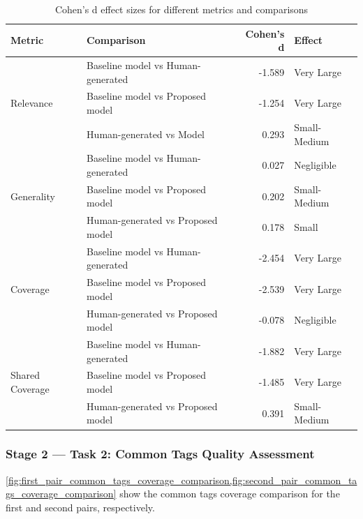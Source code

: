 \begin{table}[h]
    \centering
    \begin{tabular}{llrl}
        \hline
        \textbf{Metric} & \textbf{Comparison} & \textbf{Cohen's d} & \textbf{Effect} \\
        \hline
        \multirow{3}{*}{Relevance}
                        & Baseline model vs Human-generated   & -1.589             & Very Large      \\
                        & Baseline model  vs Proposed model   & -1.254             & Very Large      \\
                        & Human-generated vs Model      & 0.293              & Small-Medium    \\
        \hline
        \multirow{3}{*}{Generality}
                        & Baseline model vs Human-generated   & 0.027              & Negligible      \\
                        & Baseline model vs Proposed model   & 0.202              & Small-Medium    \\
                        & Human-generated vs Proposed model      & 0.178              & Small           \\
        \hline
        \multirow{3}{*}{Coverage}
                        & Baseline model vs Human-generated   & -2.454             & Very Large      \\
                        & Baseline model vs Proposed model   & -2.539             & Very Large      \\
                        & Human-generated vs Proposed model      & -0.078             & Negligible      \\
        \hline
        \multirow{3}{*}{Shared Coverage}
                        & Baseline model vs Human-generated   & -1.882             & Very Large      \\
                        & Baseline model vs Proposed model   & -1.485             & Very Large      \\
                        & Human-generated vs Proposed model      & 0.391              & Small-Medium    \\
        \hline
    \end{tabular}
    \caption{Cohen's d effect sizes for different metrics and comparisons}
    \label{tab:cohens_d}
\end{table}

\subsubsection{Stage 2 — Task 2: Common Tags Quality Assessment}
\cref{fig:first_pair_common_tags_coverage_comparison,fig:second_pair_common_tags_coverage_comparison} show the common tags coverage comparison for the first and second pairs, respectively.

